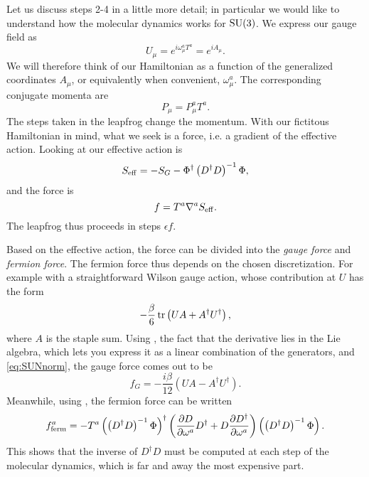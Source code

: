 Let us discuss steps 2-4 in a little more detail; in particular we would like to
understand how the molecular dynamics works for $\operatorname{SU}(3)$. We express our gauge
field as
\begin{equation}
U_\mu=e^{i\omega_\mu^aT^a}=e^{iA_\mu}.
\end{equation}
We will therefore think of our Hamiltonian as a function of the
generalized coordinates $A_\mu$, or equivalently when convenient,
$\omega_\mu^a$. The corresponding conjugate momenta are
\begin{equation}
P_\mu=P^a_\mu T^a.
\end{equation}
The steps taken in the leapfrog change the momentum. With our fictitous 
Hamiltonian in mind, what we seek is a force, i.e. a gradient of
the effective action. Looking at  our effective
action is
\begin{equation}
S_{\rm eff}=-S_G-\Phi^\dagger\left(D^\dagger D\right)^{-1}\Phi,
\end{equation}
and the force is
\begin{equation}
f=T^a\nabla^aS_{\rm eff}.
\end{equation}
The leapfrog thus proceeds in steps $\epsilon f$.

Based on the effective action, the force can be divided into the
{\it gauge force} and {\it fermion force}. The fermion force thus 
depends on the chosen discretization. For example with a straightforward Wilson
gauge action, whose contribution at $U$ has the form
\begin{equation}
-\frac{\beta}{6}\tr\left(UA+A^\dagger U^\dagger\right),
\end{equation}
where $A$ is the staple sum. Using ,
the fact that the derivative lies in the Lie algebra,
which lets you express it as a linear combination of the generators,
and \eqref{eq:SUNnorm}, the gauge force comes out to be
\begin{equation}
f_G=-\frac{i\beta}{12}\left(UA-A^\dagger U^\dagger\right).
\end{equation}
Meanwhile, using , 
the fermion force can be written 
\begin{equation}
f_{\rm ferm}^a=
-T^a\left(\left(D^\dagger D\right)^{-1}\Phi\right)^\dagger
\left(\pdv{D}{\omega^a}D^\dagger+D\pdv{D^\dagger}{\omega^a}\right)
\left(\left(D^\dagger D\right)^{-1}\Phi\right).
\end{equation}
This shows that the inverse of $D^\dagger D$ must be computed
at each step of the molecular dynamics, which is far and away
the most expensive part.

